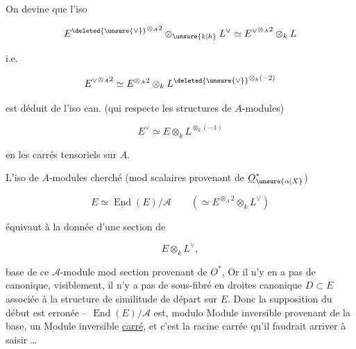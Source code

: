 
On devine que l'iso

\[
{E^{\deleted{\unsure{\vee}}}}^{\otimes_A2}\otimes_{\unsure{k|h}}L^\vee\simeq {E^\vee}^{\otimes_A2}\otimes_k L
\]

i.e.

\[
{E^\vee}^{\otimes_A2}\simeq E^{\otimes_A2}\otimes_k{L^{\deleted{\unsure{\vee}}}}^{\otimes_k(-2)}
\]

est déduit de l'iso can. (qui respecte les structures de $A$-modules)

\[
E^\vee\simeq E\otimes_k L^{\otimes_k(-1)}
\]

en  les  carrés tensoriels sur $A$.

L'iso de $A$-modules cherché (mod scalaires provenant de $\underline O_{\unsure{\alpha|X}}^*$)

\[
E\simeq\underline{\operatorname{End}}(E)/\mathcal A\qquad(\simeq E^{\otimes_A2}\otimes_k L^\vee)
\]

équivaut à la donnée d'une section de

\[
E\otimes_k L^\vee,
\]

base de ce $\mathcal A$-module mod section provenant de $O^*$, Or il n'y en a pas de canonique, visiblement,   il n'y a pas de sous-fibré en droites canonique $D\subset E$ associée à la structure de similitude de départ sur $E$. Donc la supposition du début est erronée -- $\operatorname{End}(E)/\mathcal A$ est, modulo Module inversible provenant de la base, un Module inversible \uline{carré}, et c'est la racine carrée qu'il faudrait arriver à saisir \ldots
